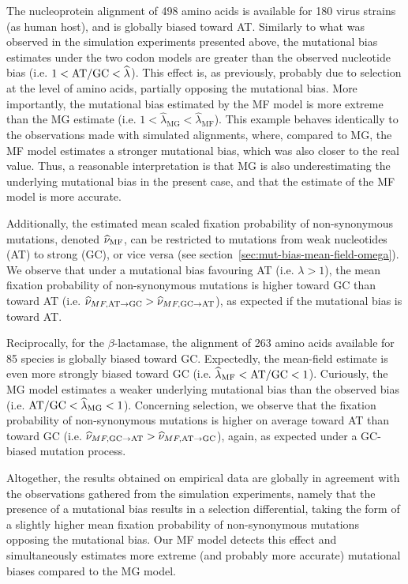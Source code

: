 The nucleoprotein alignment of 498 amino acids is available for 180 virus strains (as human host), and is globally biased toward AT.
Similarly to what was observed in the simulation experiments presented above, the mutational bias estimates under the two codon models are greater than the observed nucleotide bias (i.e. $1 < \text{AT/GC} < \widehat{\lambda}$).
This effect is, as previously, probably due to selection at the level of amino acids, partially opposing the mutational bias.
More importantly, the mutational bias estimated by the MF model is more extreme than the MG estimate (i.e. $1 < \widehat{\lambda}_{\text{MG}} < \widehat{\lambda}_{\text{MF}}$).
This example behaves identically to the observations made with simulated alignments, where, compared to MG, the MF model estimates a stronger mutational bias, which was also closer to the real value.
Thus, a reasonable interpretation is that MG is also underestimating the underlying mutational bias in the present case, and that the estimate of the MF model is more accurate.

Additionally, the estimated mean scaled fixation probability of non-synonymous mutations, denoted $\widehat{\nu}_{\text{MF}}$, can be restricted to mutations from weak nucleotides (AT) to strong (GC), or vice versa (see section~\ref{sec:mut-bias-mean-field-omega}).
We observe that under a mutational bias favouring AT (i.e. $\lambda > 1$), the mean fixation probability of non-synonymous mutations is higher toward GC than toward AT (i.e. $\widehat{\nu}_{MF,\text{AT} \rightarrow \text{GC}} > \widehat{\nu}_{MF,\text{GC} \rightarrow \text{AT}}$), as expected if the mutational bias is toward AT.

Reciprocally, for the $\beta$-lactamase, the alignment of 263 amino acids available for 85 species is globally biased toward GC.
Expectedly, the mean-field estimate is even more strongly biased toward GC (i.e. $\widehat{\lambda}_{\text{MF}} < \text{AT/GC} < 1$).
Curiously, the MG model estimates a weaker underlying mutational bias than the observed bias (i.e. $ \text{AT/GC} < \widehat{\lambda}_{\text{MG}} < 1$).
Concerning selection, we observe that the fixation probability of non-synonymous mutations is higher on average toward AT than toward GC (i.e. $\widehat{\nu}_{MF,\text{GC} \rightarrow \text{AT}} > \widehat{\nu}_{MF,\text{AT} \rightarrow \text{GC}}$), again, as expected under a GC-biased mutation process.

Altogether, the results obtained on empirical data are globally in agreement with the observations gathered from the simulation experiments, namely that the presence of a mutational bias results in a selection differential, taking the form of a slightly higher mean fixation probability of non-synonymous mutations opposing the mutational bias.
Our MF model detects this effect and simultaneously estimates more extreme (and probably more accurate) mutational biases compared to the MG model.

